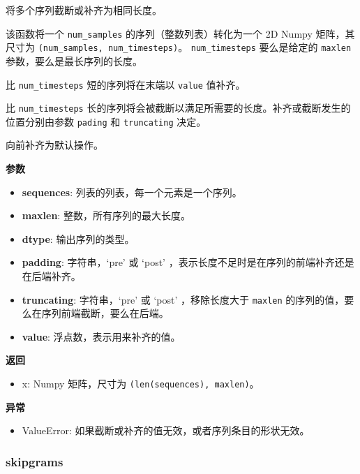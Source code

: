 将多个序列截断或补齐为相同长度。

该函数将一个 \texttt{num\_samples} 的序列（整数列表）转化为一个 2D Numpy
矩阵，其尺寸为 \texttt{(num\_samples,\ num\_timesteps)}。
\texttt{num\_timesteps} 要么是给定的 \texttt{maxlen}
参数，要么是最长序列的长度。

比 \texttt{num\_timesteps} 短的序列将在末端以 \texttt{value} 值补齐。

比 \texttt{num\_timesteps}
长的序列将会被截断以满足所需要的长度。补齐或截断发生的位置分别由参数
\texttt{pading} 和 \texttt{truncating} 决定。

向前补齐为默认操作。

\textbf{参数}

\begin{itemize}
\tightlist
\item
  \textbf{sequences}: 列表的列表，每一个元素是一个序列。
\item
  \textbf{maxlen}: 整数，所有序列的最大长度。
\item
  \textbf{dtype}: 输出序列的类型。
\item
  \textbf{padding}: 字符串，`pre' 或 `post'
  ，表示长度不足时是在序列的前端补齐还是在后端补齐。
\item
  \textbf{truncating}: 字符串，`pre' 或 `post' ，移除长度大于
  \texttt{maxlen} 的序列的值，要么在序列前端截断，要么在后端。
\item
  \textbf{value}: 浮点数，表示用来补齐的值。
\end{itemize}

\textbf{返回}

\begin{itemize}
\tightlist
\item
  x: Numpy 矩阵，尺寸为 \texttt{(len(sequences),\ maxlen)}。
\end{itemize}

\textbf{异常}

\begin{itemize}
\tightlist
\item
  ValueError: 如果截断或补齐的值无效，或者序列条目的形状无效。
\end{itemize}


\subsubsection{skipgrams}\label{skipgrams}

\begin{Shaded}
\begin{Highlighting}[]
\OperatorTok{=}
\OperatorTok{=}
\OperatorTok{=}
\OperatorTok{=}
\OperatorTok{=}
\OperatorTok{=}\NormalTok{)}
\end{Highlighting}
\end{Shaded}

